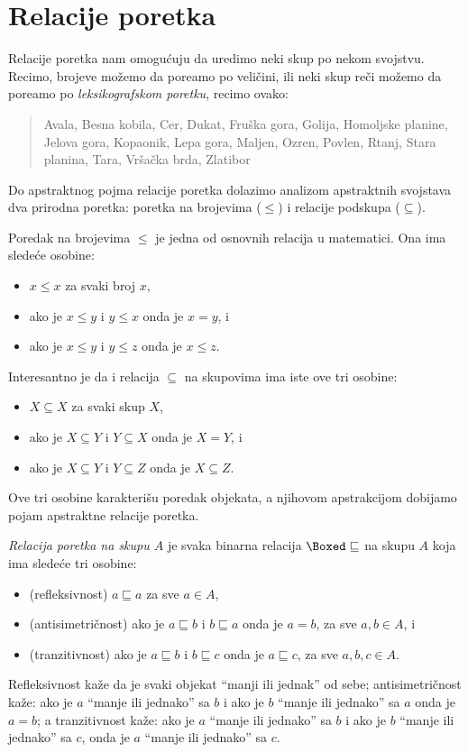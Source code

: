 \section{Relacije poretka}

Relacije poretka nam omogu\'cuju da uredimo neki skup po nekom svojstvu. Recimo, brojeve mo\v zemo da
pore\dj amo po veli\v cini, ili neki skup re\v ci mo\v zemo da pore\dj amo po \emph{leksikografskom poretku}, recimo ovako:
\begin{quote}
  Avala,
  Besna kobila,
  Cer,
  Dukat,
  Fruška gora,
  Golija,
  Homoljske planine,
  Jelova gora,
  Kopaonik,
  Lepa gora,
  Maljen,
  Ozren,
  Povlen,
  Rtanj,
  Stara planina,
  Tara,
  Vršačka brda,
  Zlatibor
\end{quote}
Do apstraktnog pojma relacije poretka dolazimo analizom apstraktnih svojstava dva prirodna poretka:
poretka na brojevima ($\le$) i relacije podskupa ($\subseteq$).

Poredak na brojevima $\le$ je jedna od osnovnih relacija u matematici. Ona ima slede\'ce osobine:
\begin{itemize}\itemsep -1.5pt
\item $x \le x$ za svaki broj $x$,
\item ako je $x \le y$ i $y \le x$ onda je $x = y$, i
\item ako je $x \le y$ i $y \le z$ onda je $x \le z$.
\end{itemize}
Interesantno je da i relacija $\subseteq$ na skupovima ima iste ove tri osobine:
\begin{itemize}\itemsep -1.5pt
\item $X \subseteq X$ za svaki skup $X$,
\item ako je $X \subseteq Y$ i $Y \subseteq X$ onda je $X = Y$, i
\item ako je $X \subseteq Y$ i $Y \subseteq Z$ onda je $X \subseteq Z$.
\end{itemize}
Ove tri osobine karakteri\v su poredak objekata, a njihovom
apstrakcijom dobijamo pojam apstraktne relacije poretka.

\emph{Relacija poretka na skupu $A$} je svaka binarna relacija $\Boxed\sqsubseteq$ na skupu $A$
koja ima slede\'ce tri osobine:
\begin{itemize}\itemsep -1.5pt
\item
  (refleksivnost) $a \sqsubseteq a$ za sve $a \in A$,
\item
  (antisimetri\v cnost) ako je $a \sqsubseteq b$ i $b \sqsubseteq a$ onda je $a = b$, za sve $a, b \in A$, i
\item
  (tranzitivnost) ako je $a \sqsubseteq b$ i $b \sqsubseteq c$ onda je $a \sqsubseteq c$, za sve $a, b, c \in A$.
\end{itemize}
Refleksivnost ka\v ze da je svaki objekat ``manji ili jednak'' od sebe;
antisimetri\v cnost ka\v ze: ako je $a$ ``manje ili jednako'' sa $b$ i ako je $b$ ``manje ili jednako'' sa $a$ onda je
$a = b$; a tranzitivnost ka\v ze: ako je $a$ ``manje ili jednako'' sa $b$ i ako je $b$ ``manje ili jednako'' sa $c$, onda je
$a$ ``manje ili jednako'' sa $c$.

